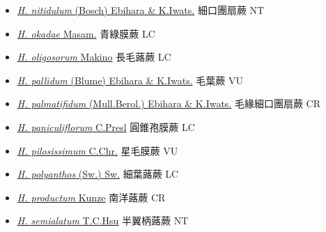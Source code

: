 \begin{itemize}
\begin{itemize}
        \item[] \href{http://www.theplantlist.org/tpl1.1/search?q=Hymenophyllum+nitidulum}{\textit{H. nitidulum} (Bosch) Ebihara \& K.Iwats.}   細口團扇蕨   NT
        \item[] \href{http://www.theplantlist.org/tpl1.1/search?q=Hymenophyllum+okadae}{\textit{H. okadae} Masam.}   青綠膜蕨   LC
        \item[] \href{http://www.theplantlist.org/tpl1.1/search?q=Hymenophyllum+oligosorum}{\textit{H. oligosorum} Makino}   長毛蕗蕨   LC
        \item[] \href{http://www.theplantlist.org/tpl1.1/search?q=Hymenophyllum+pallidum}{\textit{H. pallidum} (Blume) Ebihara \& K.Iwats.}   毛葉蕨   VU
        \item[] \href{http://www.theplantlist.org/tpl1.1/search?q=Hymenophyllum+palmatifidum}{\textit{H. palmatifidum} (Mull.Berol.) Ebihara \& K.Iwats.}   毛緣細口團扇蕨   CR
        \item[] \href{http://www.theplantlist.org/tpl1.1/search?q=Hymenophyllum+paniculiflorum}{\textit{H. paniculiflorum} C.Presl}   圓錐孢膜蕨   LC
        \item[] \href{http://www.theplantlist.org/tpl1.1/search?q=Hymenophyllum+pilosissimum}{\textit{H. pilosissimum} C.Chr.}   星毛膜蕨   VU
        \item[] \href{http://www.theplantlist.org/tpl1.1/search?q=Hymenophyllum+polyanthos}{\textit{H. polyanthos} (Sw.) Sw.}   細葉蕗蕨   LC
        \item[] \href{http://www.theplantlist.org/tpl1.1/search?q=Hymenophyllum+productum}{\textit{H. productum} Kunze}   南洋蕗蕨   CR
        \item[] \href{http://www.theplantlist.org/tpl1.1/search?q=Hymenophyllum+semialatum}{\textit{H. semialatum} T.C.Hsu}   半翼柄蕗蕨   NT

\end{itemize}
\end{itemize}
